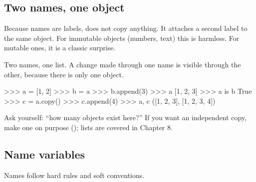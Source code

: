 \subsection{Two names, one object}

Because names are labels,  does not copy anything. It attaches a second label to the
same object. For immutable objects (numbers, text) this is harmless. For mutable ones,
it is a classic surprise.

\begin{boss}
Two names, one list. A change made through one name is visible through the other, because
there is only one object.
\medskip
\begin{center}
\end{center}
\begin{pycode}
>>> a = [1, 2]
>>> b = a
>>> b.append(3)
>>> a
[1, 2, 3]
>>> a is b
True
>>> c = a.copy()
>>> c.append(4)
>>> a, c
([1, 2, 3], [1, 2, 3, 4])
\end{pycode}
Ask yourself: ``how many objects exist here?'' If you want an independent copy, make one
on purpose (); lists are covered in Chapter 8.
\end{boss}

\subsection{Name variables}

Names follow hard rules and soft conventions.

